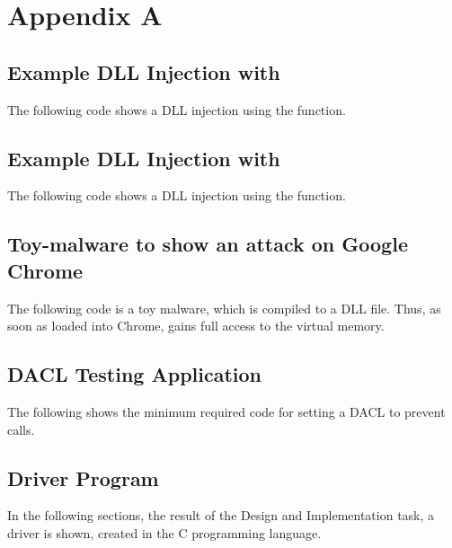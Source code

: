 \section{Appendix A}
\label{sec:appendix}

\subsection{Example DLL Injection with }
The following code shows a DLL injection using the  function.

\subsection{Example DLL Injection with }
The following code shows a DLL injection using the  function.

\subsection{Toy-malware to show an attack on Google Chrome}
The following code is a toy malware, which is compiled to a DLL file. Thus, as soon as loaded into Chrome, gains full access to the virtual memory.

\subsection{DACL Testing Application}
The following shows the minimum required code for setting a DACL to prevent  calls.


\subsection{Driver Program}

In the following sections, the result of the Design and Implementation task, a driver is shown, created in the C programming language.
